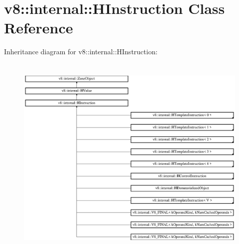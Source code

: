 \hypertarget{classv8_1_1internal_1_1_h_instruction}{}\section{v8\+:\+:internal\+:\+:H\+Instruction Class Reference}
\label{classv8_1_1internal_1_1_h_instruction}
Inheritance diagram for v8\+:\+:internal\+:\+:H\+Instruction\+:\begin{figure}[H]
\begin{center}
\leavevmode
\includegraphics[height=10.000000cm]{classv8_1_1internal_1_1_h_instruction}
\end{center}
\end{figure}
